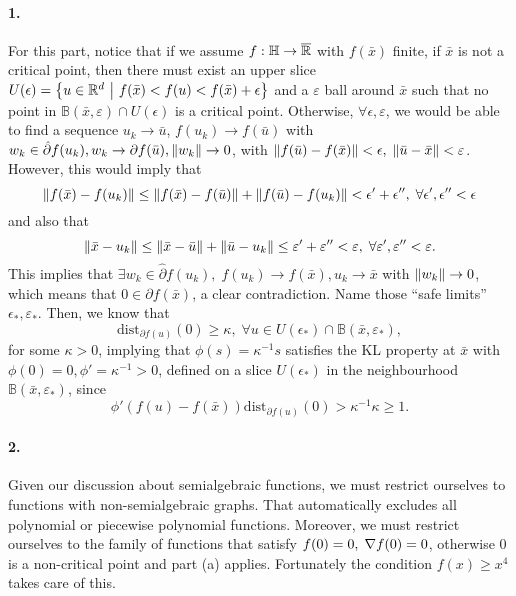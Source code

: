 \documentclass[10pt]{article}
\begin{document}
\paragraph{1.}
For this part, notice that if we assume $f: \mathbb{H} \to \overline{\mathbb{R}}$ with
$f(\bar{x})$ finite, if $\bar{x}$ is not a critical point, then there must
exist an upper slice $U(\epsilon) = \left\{ u \in \mathbb{R}^d \ \middle| \  f(\bar{x}) < f(u) <
f(\bar{x}) + \epsilon \right\}$ and a $\varepsilon$ ball around $\bar{x}$ such that no
point in $\mathbb{B}(\bar{x}, \varepsilon) \cap U(\epsilon)$ is a critical
point. Otherwise, $\forall \epsilon, \varepsilon$, we would be able to find a
sequence $u_k \to \bar{u}$, $f(u_k) \to f(\bar{u})$
with $w_k \in \hat{\partial} f(u_k), w_k \to \partial f(\bar{u}), \left \| w_k \right \|
\to 0$, with $\left \| f(\bar{u}) - f(\bar{x}) \right \| < \epsilon, \; \left \| \bar{u} -
\bar{x} \right \| < \varepsilon$. However, this would imply that
\[
    \left \| f(\bar{x}) - f(u_k) \right \| \leq \left \| f(\bar{x}) - f(\bar{u}) \right \|
    + \left \| f(\bar{u}) - f(u_k) \right \| < \epsilon' + \epsilon'', \; \forall
    \epsilon', \epsilon'' < \epsilon
\]
and also that
\[
    \left \| \bar{x} - u_k \right \| \leq \left \| \bar{x} - \bar{u} \right \| + \left \| \bar{u}- u_k \right \|
    \leq \varepsilon' + \varepsilon'' < \varepsilon, \; \forall
    \varepsilon', \varepsilon'' < \varepsilon.
\]
This implies that $\exists w_k \in \hat{\partial} f(u_k), \; f(u_k) \to
f(\bar{x}), u_k \to \bar{x}$ with $\left \| w_k \right \| \to 0$, which means that $0 \in
\partial f(\bar{x})$, a clear contradiction.
Name those ``safe limits'' $\epsilon_*, \varepsilon_*$. Then, we know that
\[
    \mathrm{dist}_{\partial f(u)}(0) \geq \kappa, \; \forall u
    \in U(\epsilon_*) \cap \mathbb{B}(\bar{x}, \varepsilon_*),
\]
for some $\kappa > 0$, implying that $\phi(s) = \kappa^{-1} s$ satisfies the
KL property at $\bar{x}$ with $\phi(0) = 0, \phi' = \kappa^{-1} > 0$, defined
on a slice $U(\epsilon_*)$ in the neighbourhood $\mathbb{B}(\bar{x},
\varepsilon_*)$, since
\[
    \phi'(f(u) - f(\bar{x})) \mathrm{dist}_{\partial f(u)}(0) >
    \kappa^{-1} \kappa \geq 1.
\]

\paragraph{2.}
Given our discussion about semialgebraic functions, we must restrict ourselves
to functions with non-semialgebraic graphs. That automatically excludes all
polynomial or piecewise polynomial functions.
Moreover, we must restrict ourselves to the family of functions that satisfy
$f(0) = 0, \;  \nabla f(0) = 0$, otherwise $0$ is a non-critical point and part
(a) applies. Fortunately the condition $f(x) \geq x^4$ takes care of this.
\end{document}
